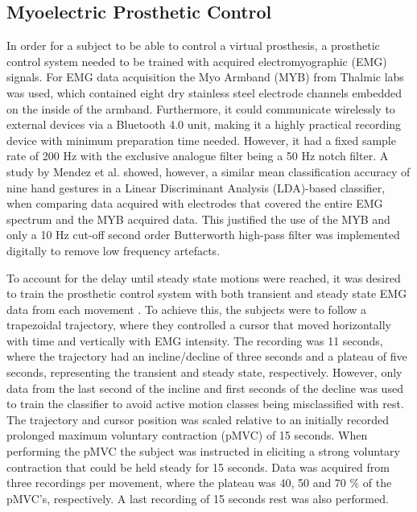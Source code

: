 \subsection{Myoelectric Prosthetic Control}

In order for a subject to be able to control a virtual prosthesis, a prosthetic control system needed to be trained with acquired electromyographic (EMG) signals. For EMG data acquisition the Myo Armband (MYB) from Thalmic labs was used, which contained eight dry stainless steel electrode channels embedded on the inside of the armband. Furthermore, it could communicate wirelessly to external devices via a Bluetooth 4.0 unit, making it a highly practical recording device with minimum preparation time needed. However, it had a fixed sample rate of 200 Hz with the exclusive analogue filter being a 50 Hz notch filter. A study by Mendez et al. \cite{Mendez2017} showed, however, a similar mean classification accuracy of nine hand gestures in a Linear Discriminant Analysis (LDA)-based classifier, when comparing data acquired with electrodes that covered the entire EMG spectrum and the MYB acquired data. This justified the use of the MYB and only a 10 Hz cut-off second order Butterworth high-pass filter was implemented digitally to remove low frequency artefacts.

To account for the delay until steady state motions were reached, it was desired to train the prosthetic control system with both transient and steady state EMG data from each movement \cite{Boschmann2013}. To achieve this, the subjects were to follow a trapezoidal trajectory, where they controlled a cursor that moved horizontally with time and vertically with EMG intensity. The recording was 11 seconds, where the trajectory had an incline/decline of three seconds and a plateau of five seconds, representing the transient and steady state, respectively. However, only data from the last second of the incline and first seconds of the decline was used to train the classifier to avoid active motion classes being misclassified with rest. The trajectory and cursor position was scaled relative to an initially recorded prolonged maximum voluntary contraction (pMVC) of 15 seconds. When performing the pMVC the subject was instructed in eliciting a strong voluntary contraction that could be held steady for 15 seconds. Data was acquired from three recordings per movement, where the plateau was 40, 50 and 70 $\%$ of the pMVC's, respectively. A last recording of 15 seconds rest was also performed.

